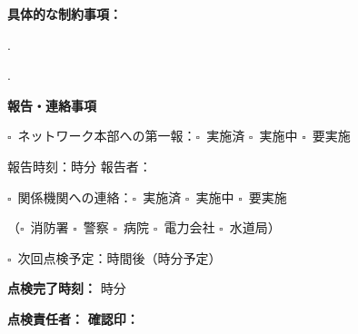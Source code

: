 \documentclass[a4paper,12pt]{jarticle}
\newcommand{\checkbox}{$\square$\ }
\newcommand{\underlinespace}[1]{\underline{\hspace{#1}}}
\begin{document}
\vspace{3mm}

\noindent
\textbf{具体的な制約事項：}

\vspace{2mm}

. \underlinespace{12cm}

\vspace{2mm}

. \underlinespace{12cm}

\vspace{8mm}

\begin{center}
\textbf{\large 報告・連絡事項}
\end{center}

\vspace{3mm}

\noindent
\checkbox ネットワーク本部への第一報：\checkbox 実施済 \quad \checkbox 実施中 \quad \checkbox 要実施

\vspace{2mm}

\noindent
報告時刻：\underlinespace{2cm}時\underlinespace{2cm}分 \quad 報告者：\underlinespace{4cm}

\vspace{3mm}

\noindent
\checkbox 関係機関への連絡：\checkbox 実施済 \quad \checkbox 実施中 \quad \checkbox 要実施

\vspace{2mm}

\noindent
（\checkbox 消防署 \quad \checkbox 警察 \quad \checkbox 病院 \quad \checkbox 電力会社 \quad \checkbox 水道局）

\vspace{3mm}

\noindent
\checkbox 次回点検予定：\underlinespace{2cm}時間後（\underlinespace{2cm}時\underlinespace{2cm}分予定）

\vspace{3mm}

\noindent
\textbf{点検完了時刻：} \underlinespace{1cm}時\underlinespace{1cm}分

\vspace{3mm}

\noindent
\textbf{点検責任者：} \underlinespace{4cm} \quad \textbf{確認印：} \underlinespace{3cm}
\end{document}

